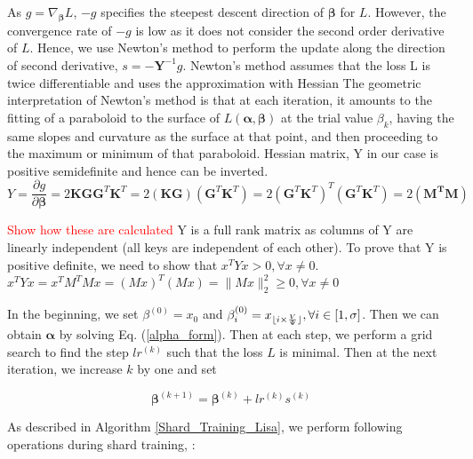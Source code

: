 As $g=\nabla_{\boldsymbol{\beta}} L$, $-g$ specifies the steepest descent direction of $\boldsymbol{\beta}$ for $L$. However, the convergence rate of $-g$ is low as it does not consider the second order derivative of $L$. Hence, we use Newton's method to perform the update along the direction of second derivative, $s=-\boldsymbol{Y}^{-1}g$. Newton's method assumes that the loss L is twice differentiable and uses the approximation with Hessian
The geometric interpretation of Newton's method is that at each iteration, it amounts to the fitting of a paraboloid to the surface of $L(\boldsymbol{\alpha},\boldsymbol{\beta})$  at the trial value $\beta_{k}$, having the same slopes and curvature as the surface at that point, and then proceeding to the maximum or minimum of that paraboloid. 
Hessian matrix, Y in our case is positive semidefinite and hence can be inverted. 
\begin{equation}
	Y=\frac{\partial g}{\partial \boldsymbol{\beta}}=2\boldsymbol{KGG}^T \boldsymbol{K}^T= 2 \boldsymbol{(KG)} (\boldsymbol{G}^T \boldsymbol{K}^T)=2 (\boldsymbol{G}^T \boldsymbol{K}^T)^T (\boldsymbol{G}^T \boldsymbol{K}^T)= 2\boldsymbol{({M}^TM)}
\end{equation}

\textcolor{red}{Show how these are calculated}
Y is a full rank matrix as columns of Y are linearly independent (all keys are independent of each other). To prove that Y is positive definite, we need to show that ${x}^TYx > 0,  \forall x \neq 0$. \\ 
${x}^TYx = {x}^T{M}^TMx = {(Mx)}^T(Mx) = \| Mx\|_{2}^{2} \geq 0,\forall x \neq 0 $


In the beginning, we set $\beta^{(0)}=x_0$ and $\beta_i^{(0)}=x_{\lfloor i\times \frac{V}{\Psi}\rfloor}, \forall i\in[1,\sigma]$. Then we can obtain $\boldsymbol{\alpha}$ by solving Eq. (\ref{alpha_form}). Then at each step, we perform a grid search to find the step $lr^{(k)}$ such that the loss $L$ is minimal. Then at the next iteration, we increase $k$ by one and set 

$$
\boldsymbol{\beta}^{(k+1)}=\boldsymbol{\beta}^{(k)} + lr^{(k)}s^{(k)}
$$


As described in Algorithm \ref{Shard_Training_Lisa}, we perform  following operations during shard training, :


